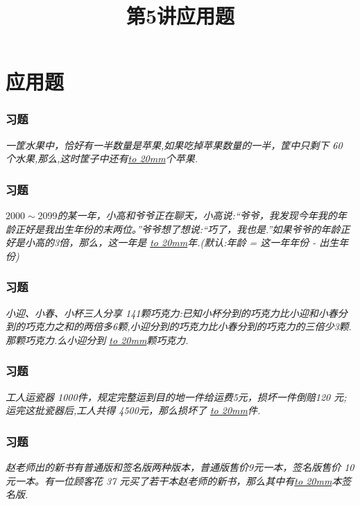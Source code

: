 \section{应用题}

\title[第5讲\quad 应用题]{第5讲\quad 应用题} 
\author{}
\date{}

\begin{frame}
    \titlepage
\end{frame}

\setcounter{framecounter}{0}

\begin{frame}
    \frametitle{习题\theframecounter}
    \vspace*{-3cm}
    \textit{一筐水果中，恰好有一半数量是苹果,如果吃掉苹果数量的一半，筐中只剩下 60 个水果,那么,这时筐子中还有\underline{\hbox to 20mm{}}个苹果.} 
\end{frame}

\begin{frame}
    \frametitle{习题\theframecounter}
    \vspace*{-3cm}
    \textit{$2000\sim 2099$的某一年，小高和爷爷正在聊天，小高说:``爷爷，我发现今年我的年龄正好是我出生年份的末两位。''爷爷想了想说:``巧了，我也是.''如果爷爷的年龄正好是小高的3倍，那么，这一年是  \underline{\hbox to 20mm{}}年.(默认:年龄 = 这一年年份 - 出生年份)} 
\end{frame}

\begin{frame}
    \frametitle{习题\theframecounter}
    \vspace*{-3cm}
    \textit{小迎、小春、小杯三人分享 141颗巧克力:已知小杯分到的巧克力比小迎和小春分到的巧克力之和的两倍多6颗,小迎分到的巧克力比小春分到的巧克力的三倍少3颗.那颗巧克力.么小迎分到  \underline{\hbox to 20mm{}}颗巧克力.} 
\end{frame}

\begin{frame}
    \frametitle{习题\theframecounter}
    \vspace*{-3cm}
    \textit{工人运瓷器 1000件，规定完整运到目的地一件给运费5元，损坏一件倒赔120 元;运完这批瓷器后,工人共得 4500元，那么损坏了 \underline{\hbox to 20mm{}}件.} 
\end{frame}

\begin{frame}
    \frametitle{习题\theframecounter}
    \vspace*{-3cm}
    \textit{赵老师出的新书有普通版和签名版两种版本，普通版售价9元一本，签名版售价 10 元一本。有一位顾客花 37 元买了若干本赵老师的新书，那么其中有\underline{\hbox to 20mm{}}本签名版.} 
\end{frame}


